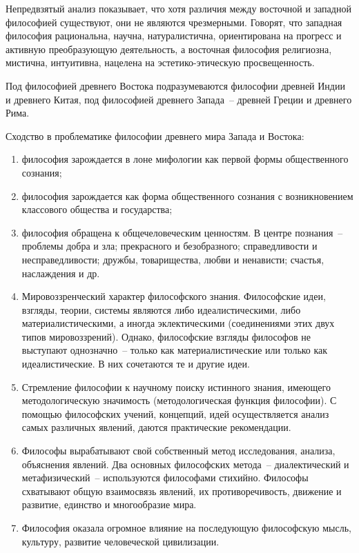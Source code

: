 
Непредвзятый анализ показывает, что хотя различия между восточной и западной философией существуют,
они не являются чрезмерными. Говорят, что западная философия рациональна, научна, натуралистична,
ориентирована на прогресс и активную преобразующую деятельность, а восточная философия религиозна,
мистична, интуитивна, нацелена на эстетико-этическую просвещенность.

Под философией древнего Востока подразумеваются философии древней Индии и древнего Китая, под
философией древнего Запада~-- древней Греции и древнего Рима.

Сходство в проблематике философии древнего мира Запада и Востока:
\begin{enumerate}
    \vspace*{-1.8ex}
    \itemsep-1.2ex
    \item философия за­рождается в лоне мифологии как первой формы общественного сознания;
    \item философия зарождается как форма общественного сознания с возникновением классового
        общества и государства;
    \item философия обращена к общечеловеческим ценностям. В центре познания~-- проблемы
        добра и зла; прекрасного и безобразного; справедливости и несправедливости; дружбы,
        товарищества, любви и ненависти; счастья, наслаждения и др.
    \item Мировоззренческий характер философского знания. Философские идеи, взгляды, теории,
        системы являются либо идеалистическими, либо материалистическими, а иногда
        эклектическими (соединениями этих двух типов мировоззрений). Однако, философские
        взгляды философов не выступают однозначно~-- только как материалистические или только
        как идеалистические. В них сочетаются те и другие идеи.
    \item Стремление философии к научному поиску истинного знания, имеющего методологическую
        значимость (методологическая функция философии). С помощью философских учений,
        концепций, идей осуществляется ана­лиз самых раз­личных явлений, даются практические
        рекомендации.
    \item Философы вырабатывают свой собственный метод исследования, ана­лиза, объяснения
        явлений. Два основных философских метода~-- диалектический и метафизический~--
        используются философами стихийно. Философы схватывают общую взаимосвязь явлений, их
        противоречивость, движение и развитие, единство и многообразие мира.
    \item Философия оказала огромное влияние на последующую философ­скую мысль, куль­туру,
        развитие человеческой цивилизации.
    \vspace*{-1.8ex}
\end{enumerate}

